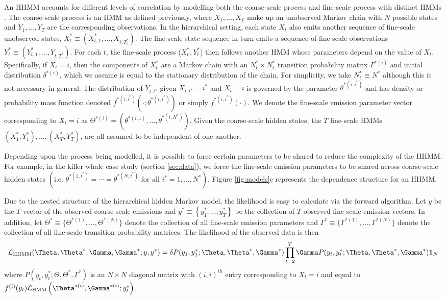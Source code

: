 An HHMM accounts for different levels of correlation by modelling both the coarse-scale process and fine-scale process with distinct HMMs \citep{Barajas:2017,Adam:2019}. The coarse-scale process is an HMM as defined previously, where $X_1, \ldots, X_T$ make up an unobserved Markov chain with $N$ possible states and $Y_1,\ldots, Y_T$ are the corresponding observations.   
%
In the hierarchical setting, each state $X_t$ also emits another sequence of fine-scale unobserved states, $X_t^* \equiv (X_{t,1}^*,\ldots, X_{t,T_t^*})$. The fine-scale state sequence in turn emits a sequence of fine-scale observations $Y_t^* \equiv (Y_{t,1}^*,\ldots, Y_{t,T_t^*})$. For each $t$, the fine-scale process ($X_t^*, Y_t^*$) then follows another HMM whose parameters depend on the value of $X_t$. Specifically, if $X_t=i$, then the components of $X_t^*$ are a Markov chain with an $N^*_t \times N^*_t$ transition probability matrix $\Gamma^{*(i)}$ and initial distribution $\delta^{*(i)}$, which we assume is equal to the stationary distribution of the chain. For simplicity, we take $N_t^* \equiv N^*$ although this is not necessary in general. The distribution of $Y_{t,t^*}$ given $X_{t,t^*}=i^*$ and $X_t=i$ is governed by the parameter $\theta^{*(i,i^*)}$ and has density or probability mass function denoted $f^{*(i,i^*)}\left(\cdot; \theta^{*(i,i^*)}\right)$ or simply $f^{*(i,i^*)}(\cdot)$. We denote the fine-scale emission parameter vector corresponding to $X_t=i$ as $\Theta^{*(i)}=\left(\theta^{*(i,1)}, \ldots, \theta^{*(i,N^*)}\right)$. Given the coarse-scale hidden states, the $T$ fine-scale HMMs $(X_1^*, Y_1^*), \ldots, (X_T^*, Y_T^*)$, are all assumed to be independent of one another.

Depending upon the process being modelled, it is possible to force certain parameters to be shared to reduce the complexity of the HHMM. For example, in the killer whale case study (section \ref{sec:data}), we force the fine-scale emission parameters to be shared across coarse-scale hidden states $\left( \text{i.e. } \theta^{*(1,i^*)} = \cdots = \theta^{*(N,i^*)} \text{ for all } i^* = 1, \ldots, N^* \right)$. Figure \ref{fig:models}c represents the dependence structure for an HHMM. 

Due to the nested structure of the hierarchical hidden Markov model, the likelihood is easy to calculate via the forward algorithm.
%
Let $y$ be the $T$-vector of the observed coarse-scale emissions and
$y^* \equiv \left\{y^*_1, \ldots,y^*_T\right\}$ be the collection of $T$ observed fine-scale emission vectors.
%
In addition, let $\Theta^* \equiv \{\Theta^{*(1)}, \ldots, \Theta^{*(N)}\}$ denote the collection of all fine-scale emission parameters and $\Gamma^* \equiv \{\Gamma^{*(1)}, \ldots, \Gamma^{*(N)}\}$ denote the collection of all fine-scale transition probability matrices. The likelihood of the observed data is then
%
\[
\calL_{\text{HHMM}}(\Theta,\Theta^*,\Gamma,\Gamma^*;y,y^*) = \delta P(y_1,y_1^*;\Theta,\Theta^*,\Gamma^*) \prod_{t=2}^T \Gamma P(y_t,y_t^*;\Theta,\Theta^*,\Gamma^*) \mathbf{1}_N
\]
%
where $P(y_t,y_t^*;\Theta,\Theta^*,\Gamma^*)$ is an $N \times N$ diagonal matrix with $(i,i)^{th}$ entry corresponding to $X_t=i$ and equal to 
$f^{(i)}(y_t)\calL_{\text{HMM}}\left(\Theta^{*(i)},
\Gamma^{*(i)};y_t^*\right)$. 

